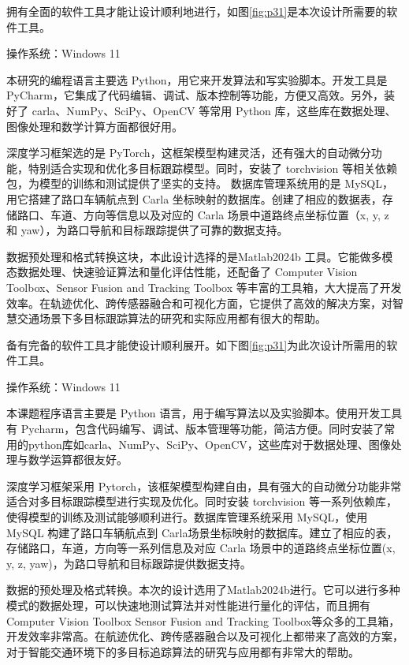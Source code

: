 拥有全面的软件工具才能让设计顺利地进行，如图\ref{fig:p31}是本次设计所需要的软件工具。

操作系统：Windows 11

本研究的编程语言主要选 Python，用它来开发算法和写实验脚本。开发工具是 PyCharm，它集成了代码编辑、调试、版本控制等功能，方便又高效。另外，装好了 carla、NumPy、SciPy、OpenCV 等常用 Python 库，这些库在数据处理、图像处理和数学计算方面都很好用。

深度学习框架选的是 PyTorch，这框架模型构建灵活，还有强大的自动微分功能，特别适合实现和优化多目标跟踪模型。同时，安装了 torchvision 等相关依赖包，为模型的训练和测试提供了坚实的支持。
数据库管理系统用的是 MySQL，用它搭建了路口车辆航点到 Carla 坐标映射的数据库。创建了相应的数据表，存储路口、车道、方向等信息以及对应的 Carla 场景中道路终点坐标位置（x, y, z 和 yaw），为路口导航和目标跟踪提供了可靠的数据支持。

数据预处理和格式转换这块，本此设计选择的是Matlab2024b 工具。它能做多模态数据处理、快速验证算法和量化评估性能，还配备了 Computer Vision Toolbox、Sensor Fusion and Tracking Toolbox 等丰富的工具箱，大大提高了开发效率。在轨迹优化、跨传感器融合和可视化方面，它提供了高效的解决方案，对智慧交通场景下多目标跟踪算法的研究和实际应用都有很大的帮助。




备有完备的软件工具才能使设计顺利展开。如下图\ref{fig:p31}为此次设计所需用的软件工具。

操作系统：Windows 11

本课题程序语言主要是 Python 语言，用于编写算法以及实验脚本。使用开发工具有 Pycharm，包含代码编写、调试、版本管理等功能，简洁方便。同时安装了常用的python库如carla、NumPy、SciPy、OpenCV，这些库对于数据处理、图像处理与数学运算都很友好。

深度学习框架采用 Pytorch，该框架模型构建自由，具有强大的自动微分功能非常适合对多目标跟踪模型进行实现及优化。同时安装 torchvision 等一系列依赖库，使得模型的训练及测试能够顺利进行。数据库管理系统采用 MySQL，使用 MySQL 构建了路口车辆航点到 Carla场景坐标映射的数据库。建立了相应的表，存储路口，车道，方向等一系列信息及对应 Carla 场景中的道路终点坐标位置(x, y, z, yaw)，为路口导航和目标跟踪提供数据支持。

数据的预处理及格式转换。本次的设计选用了Matlab2024b进行。它可以进行多种模式的数据处理，可以快速地测试算法并对性能进行量化的评估，而且拥有Computer Vision Toolbox Sensor Fusion and Tracking Toolbox等众多的工具箱，开发效率非常高。在航迹优化、跨传感器融合以及可视化上都带来了高效的方案，对于智能交通环境下的多目标追踪算法的研究与应用都有非常大的帮助。



